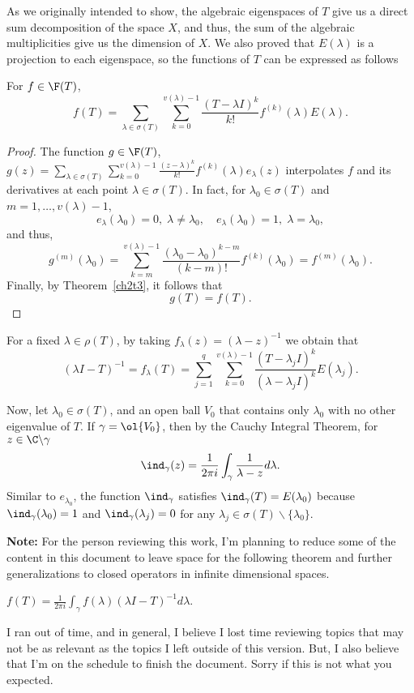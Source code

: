 As we originally intended to show, the algebraic eigenspaces of $T$ give us a direct sum decomposition of the space $X$, and thus, the sum of the algebraic multiplicities give us the dimension of $X$. We also proved that $E(\lambda)$ is a projection to each eigenspace, so the functions of $T$ can be expressed as follows

\begin{theorem}
    For $f \in \F(T)$,
    \[ f(T) = \sum_{\lambda \in \sigma(T)} \sum_{k = 0}^{v(\lambda)-1} \frac{(T-\lambda I)^k}{k!} f^{(k)}(\lambda) E(\lambda). \]
\end{theorem}

\begin{proof}
    The function $g \in \F(T)$, $g(z) = \sum_{\lambda \in \sigma(T)} \sum_{k = 0}^{v(\lambda)-1} \frac{(z-\lambda)^k}{k!} f^{(k)}(\lambda) e_\lambda(z)$ interpolates $f$ and its derivatives at each point $\lambda \in \sigma(T)$. In fact, for $\lambda_0 \in \sigma(T)$ and $m = 1,\ldots, v(\lambda) - 1$, 
    \[ e_\lambda(\lambda_0) = 0,\; \lambda \neq \lambda_0,\quad e_\lambda(\lambda_0) = 1,\; \lambda = \lambda_0,  \]
    and thus,
    \[ g^{(m)}(\lambda_0) = \sum_{k = m}^{v(\lambda)-1} \frac{(\lambda_0-\lambda_0)^{k-m}}{(k-m)!} f^{(k)}(\lambda_0) = f^{(m)}(\lambda_0).\]
    Finally, by Theorem~\ref{ch2t3}, it follows that
    \[ g(T) = f(T). \]
\end{proof}

For a fixed $\lambda \in \rho(T)$, by taking $f_\lambda(z) = (\lambda - z)^{-1}$ we obtain that
\[ (\lambda I - T)^{-1} = f_\lambda(T) = \sum_{j = 1}^{q} \sum_{k = 0}^{v(\lambda)-1} \frac{(T-\lambda_j I)^k }{(\lambda -\lambda_j I)^k} E(\lambda_j). \]

Now, let $\lambda_0 \in \sigma(T)$, and an open ball $V_0$ that contains only $\lambda_0$ with no other eigenvalue of $T$. If $\gamma = \ol{V_0}$, then by the Cauchy Integral Theorem, for $z \in \C \backslash \gamma$
\[ \ind_\gamma(z) = \frac{1}{2\pi i}\int_\gamma \frac{1}{\lambda - z} d\lambda. \]
Similar to $e_{\lambda_0}$, the function $\ind_\gamma$ satisfies $\ind_\gamma(T) = E(\lambda_0)$ because $\ind_\gamma(\lambda_0) = 1$ and $\ind_\gamma(\lambda_j) = 0$ for any $\lambda_j \in \sigma(T)\backslash\{\lambda_0\}$.

\textbf{Note:} For the person reviewing this work, I'm planning to reduce some of the content in this document to leave space for the following theorem and further generalizations to closed operators in infinite dimensional spaces.

\begin{theorem}
    $f(T) = \frac{1}{2\pi i} \int_{\gamma} f(\lambda) (\lambda I - T)^{-1} d\lambda$.
\end{theorem}

I ran out of time, and in general, I believe I lost time reviewing topics that may not be as relevant as the topics I left outside of this version. But, I also believe that I'm on the schedule to finish the document. Sorry if this is not what you expected.